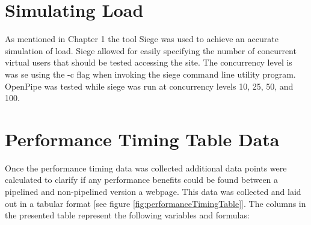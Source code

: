 \documentclass[12pt]{report}
\begin{document}
\section{Simulating Load}
As mentioned in Chapter 1 the tool Siege was used to achieve an accurate simulation of load. Siege allowed for easily specifying the number of concurrent virtual users that should be tested accessing the site. The concurrency level is was se using the -c flag when invoking the siege command line utility program.  OpenPipe was tested while siege was run at concurrency levels 10, 25, 50, and 100. 
 

\section{Performance Timing Table Data}
Once the performance timing data was collected additional data points were calculated to clarify if any performance benefits could be found between a pipelined and non-pipelined version a webpage. This data was collected and laid out in a tabular format [see figure \ref{fig:performanceTimingTable}]. The columns in the presented table represent the following variables and formulas:
\end{document}

